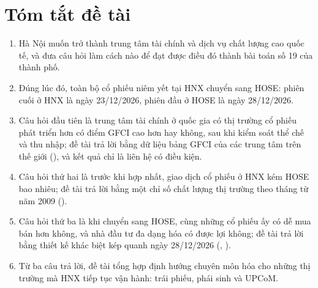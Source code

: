 \cleardoublepage
\chapter*{Tóm tắt đề tài}

\begin{enumerate}
\item Hà Nội muốn trở thành trung tâm tài chính và dịch vụ chất lượng cao quốc tế, và đưa câu hỏi làm cách nào để đạt được điều đó thành bài toán số 19 của thành phố.
\item Đúng lúc đó, toàn bộ cổ phiếu niêm yết tại HNX chuyển sang HOSE: phiên cuối ở HNX là ngày 23/12/2026, phiên đầu ở HOSE là ngày 28/12/2026.
\item Câu hỏi đầu tiên là trung tâm tài chính ở quốc gia có thị trường cổ phiếu phát triển hơn có điểm GFCI cao hơn hay không, sau khi kiểm soát thể chế và thu nhập; đề tài trả lời bằng dữ liệu bảng GFCI của các trung tâm trên thế giới (), và kết quả chỉ là liên hệ có điều kiện.
\item Câu hỏi thứ hai là trước khi hợp nhất, giao dịch cổ phiếu ở HNX kém HOSE bao nhiêu; đề tài trả lời bằng một chỉ số chất lượng thị trường theo tháng từ năm 2009 ().
\item Câu hỏi thứ ba là khi chuyển sang HOSE, cùng những cổ phiếu ấy có dễ mua bán hơn không, và nhà đầu tư đa dạng hóa có được lợi không; đề tài trả lời bằng thiết kế khác biệt kép quanh ngày 28/12/2026 (, ).
\item Từ ba câu trả lời, đề tài tổng hợp định hướng chuyên môn hóa cho những thị trường mà HNX tiếp tục vận hành: trái phiếu, phái sinh và UPCoM.
\end{enumerate}
